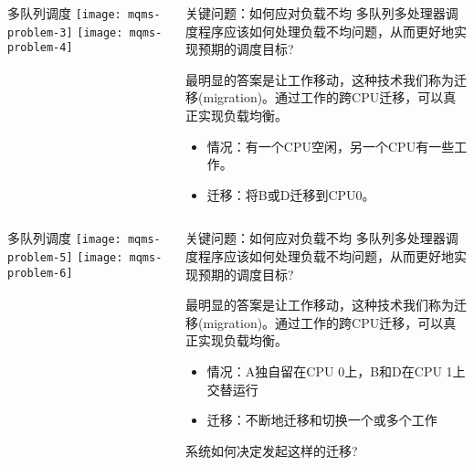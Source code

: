 \begin{frame}
	\begin{columns}
		\begin{column}{.5\textwidth}
			\Large \centering
			多队列调度
			\texttt{[image: mqms-problem-3]}
			\texttt{[image: mqms-problem-4]}	
		\end{column}
		
		\begin{column}{.5\textwidth}
			\begin{block}{关键问题：如何应对负载不均}
			多队列多处理器调度程序应该如何处理负载不均问题，从而更好地实现预期的调度目标?
			\end{block} 
			\normalsize
			最明显的答案是让工作移动，这种技术我们称为迁移(migration)。通过工作的跨CPU迁移，可以真正实现负载均衡。
			
			\begin{itemize}
				\item 情况：有一个CPU空闲，另一个CPU有一些工作。
				\item 迁移：将B或D迁移到CPU0。
		
			\end{itemize}
			\Large

		\end{column}
	\end{columns}
\end{frame}



\begin{frame}
	\begin{columns}
		\begin{column}{.5\textwidth}
			\Large \centering
			多队列调度
			\texttt{[image: mqms-problem-5]}
			\texttt{[image: mqms-problem-6]}	
		\end{column}
		
		\begin{column}{.5\textwidth}
			\begin{block}{关键问题：如何应对负载不均}
				多队列多处理器调度程序应该如何处理负载不均问题，从而更好地实现预期的调度目标?
			\end{block} 
			最明显的答案是让工作移动，这种技术我们称为迁移(migration)。通过工作的跨CPU迁移，可以真正实现负载均衡。
			
			\begin{itemize}
				\item 情况：A独自留在CPU 0上，B和D在CPU 1上交替运行
				\item 迁移：不断地迁移和切换一个或多个工作

			\end{itemize}
		\large
		系统如何决定发起这样的迁移?
			\Large
			
		\end{column}
	\end{columns}
\end{frame}



